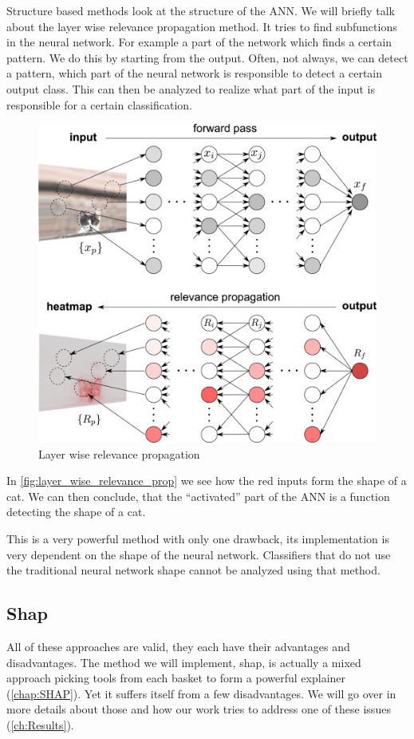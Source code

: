 Structure based methods look at the structure of the ANN. We will briefly talk about the layer wise relevance propagation method. It tries to find subfunctions in the neural network. For example a part of the network which finds a certain pattern. We do this by starting from the output. Often, not always, we can detect a pattern, which part of the neural network is responsible to detect a certain output class. This can then be analyzed to realize what part of the input is responsible for a certain classification.\\

\begin{figure}[H]
  \centering
    \includegraphics[width=\linewidth]{images/02_related_works/Layer wise relevance propagation2.png}
  \caption{Layer wise relevance propagation \cite{LRP}}
  \label{fig:layer_wise_relevance_prop}
\end{figure}

In \autoref{fig:layer_wise_relevance_prop} we see how the red inputs form the shape of a cat. We can then conclude, that the \enquote{activated} part of the ANN is a function detecting the shape of a cat.

This is a very powerful method with only one drawback, its implementation is very dependent on the shape of the neural network. Classifiers that do not use the traditional neural network shape cannot be analyzed using that method.

\subsection{Shap}

All of these approaches are valid, they each have their advantages and disadvantages. The method we will implement, shap, is actually a mixed approach picking tools from each basket to form a powerful explainer (\autoref{chap:SHAP}). Yet it suffers itself from a few disadvantages. We will go over in more details about those and how our work tries to address one of these issues (\autoref{ch:Results}).